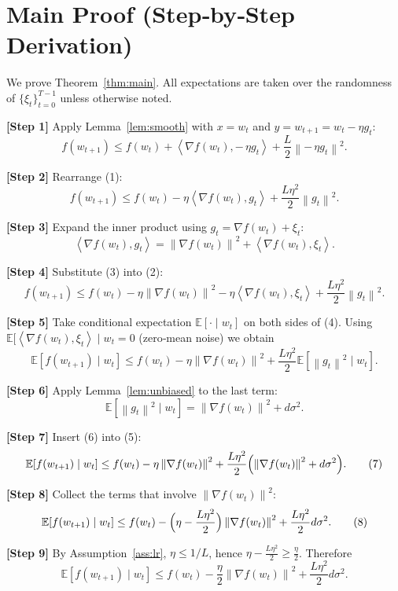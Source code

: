 \documentclass{article}
\newcommand{\EE}{\mathbb{E}}
\newcommand{\norm}[1]{\left\lVert #1\right\rVert}
\newcommand{\inner}[2]{\left\langle #1,#2\right\rangle}
\begin{document}
\section*{Main Proof (Step‑by‑Step Derivation)}
We prove Theorem~\ref{thm:main}. All expectations are taken over the randomness of $\{\xi_{t}\}_{t=0}^{T-1}$ unless otherwise noted.

\bigskip
\noindent\textbf{[Step 1]} Apply Lemma~\ref{lem:smooth} with $x=w_{t}$ and $y=w_{t+1}=w_{t}-\eta g_{t}$:
\[
f(w_{t+1})\le f(w_{t})+\inner{\nabla f(w_{t})}{-\,\eta g_{t}}+\frac{L}{2}\norm{-\,\eta g_{t}}^{2}.
\tag{1}
\]

\noindent\textbf{[Step 2]} Rearrange (1):
\[
f(w_{t+1})\le f(w_{t})-\eta\inner{\nabla f(w_{t})}{g_{t}}+\frac{L\eta^{2}}{2}\norm{g_{t}}^{2}.
\tag{2}
\]

\noindent\textbf{[Step 3]} Expand the inner product using $g_{t}= \nabla f(w_{t})+\xi_{t}$:
\[
\inner{\nabla f(w_{t})}{g_{t}}=\norm{\nabla f(w_{t})}^{2}+\inner{\nabla f(w_{t})}{\xi_{t}}.
\tag{3}
\]

\noindent\textbf{[Step 4]} Substitute (3) into (2):
\[
f(w_{t+1})\le f(w_{t})-\eta\norm{\nabla f(w_{t})}^{2}
-\eta\inner{\nabla f(w_{t})}{\xi_{t}}
+\frac{L\eta^{2}}{2}\norm{g_{t}}^{2}.
\tag{4}
\]

\noindent\textbf{[Step 5]} Take conditional expectation $\EE[\cdot\mid w_{t}]$ on both sides of (4). Using $\EE[\inner{\nabla f(w_{t})}{\xi_{t}}\mid w_{t}=0$ (zero‑mean noise) we obtain
\[
\EE\!\left[f(w_{t+1})\mid w_{t}\right]\le f(w_{t})-\eta\norm{\nabla f(w_{t})}^{2}
+\frac{L\eta^{2}}{2}\EE\!\left[\norm{g_{t}}^{2}\mid w_{t}\right].
\tag{5}
\]

\noindent\textbf{[Step 6]} Apply Lemma~\ref{lem:unbiased} to the last term:
\[
\EE\!\left[\norm{g_{t}}^{2}\mid w_{t}\right]
= \norm{\nabla f(w_{t})}^{2}+d\sigma^{2}.
\tag{6}
\]

\noindent\textbf{[Step 7]} Insert (6) into (5):
\[
\EE\!\left[f(w_{t+1})\mid w_{t}\right]\le
f(w_{t})-\eta\norm{\nabla f(w_{t})}^{2}
+\frac{L\eta^{2}}{2}\Bigl(\norm{\nabla f(w_{t})}^{2}+d\sigma^{2}\Bigr).
\tag{7}
\]

\noindent\textbf{[Step 8]} Collect the terms that involve $\norm{\nabla f(w_{t})}^{2}$:
\[
\EE\!\left[f(w_{t+1})\mid w_{t}\right]\le
f(w_{t})-\Bigl(\eta-\frac{L\eta^{2}}{2}\Bigr)\norm{\nabla f(w_{t})}^{2}
+\frac{L\eta^{2}}{2}d\sigma^{2}.
\tag{8}
\]

\noindent\textbf{[Step 9]} By Assumption~\ref{ass:lr}, $\eta\le 1/L$, hence $\eta-\frac{L\eta^{2}}{2}\ge \frac{\eta}{2}$. Therefore
\[
\EE\!\left[f(w_{t+1})\mid w_{t}\right]\le
f(w_{t})-\frac{\eta}{2}\norm{\nabla f(w_{t})}^{2}
+\frac{L\eta^{2}}{2}d\sigma^{2}.
\tag{9}
\]
\end{document}

